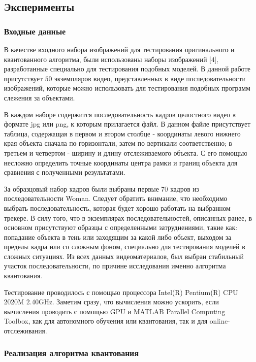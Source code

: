 \subsection{Эксперименты}
\subsubsection{Входные данные}
В качестве входного набора изображений для тестирования оригинального и квантованного алгоритма, были использованы наборы изображений [4], разработанные специально для тестирования подобных моделей. В данной работе присутствует $50$ экземпляров видео, представленных в виде последовательности изображений, которые можно использовать для тестирования подобных программ слежения за объектами. 

В каждом наборе содержится последовательность кадров целостного видео в формате jpg или png, к которым прилагается файл. В данном файле присутствует таблица, содержащая в первом и втором столбце - координаты левого нижнего края объекта сначала по горизонтали, затем по вертикали соответственно; в третьем и четвертом - ширину и длину отслеживаемого объекта. С его помощью несложно определить точные координаты центра рамки и границ объекта для сравнения с полученными результатами.

За образцовый набор кадров были выбраны первые 70 кадров из последовательности Woman. Следует обратить внимание, что необходимо выбрать последовательность, которая будет хорошо работать на выбранном трекере. В силу того, что в экземплярах последовательностей, описанных ранее, в основном присутствуют образцы с определенными затруднениями, такие как: попадание объекта в тень или заходящим за какой либо объект, выходом за пределы кадра или со сложным фоном, специально для тестирования моделей в сложных ситуациях. Из всех данных видеоматериалов, был выбран стабильный участок последовательности, по причине исследования именно алгоритма квантования.

Тестирование проводилось с помощью процессора Intel(R) Pentium(R) CPU 2020M 2.40GHz. Заметим сразу, что вычисления можно ускорить, если вычисления проводить с помощью GPU и MATLAB Parallel Computing Toolbox, как для автономного обучения или квантования, так и для online-отслеживания.

\subsubsection{Реализация алгоритма квантования}

